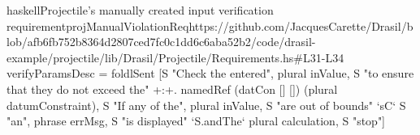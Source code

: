 \begin{codeSnippet}{haskell}{Projectile's manually created input verification requirement}{projManualViolationReq}{https://github.com/JacquesCarette/Drasil/blob/afb6fb752b8364d2807ced7fc0c1dd6c6aba52b2/code/drasil-example/projectile/lib/Drasil/Projectile/Requirements.hs\#L31-L34}
verifyParamsDesc = foldlSent [S "Check the entered", plural inValue,
    S "to ensure that they do not exceed the" +:+. namedRef (datCon [] []) (plural datumConstraint),
    S "If any of the", plural inValue, S "are out of bounds" `sC`
    S "an", phrase errMsg, S "is displayed" `S.andThe` plural calculation, S "stop"]
\end{codeSnippet}
